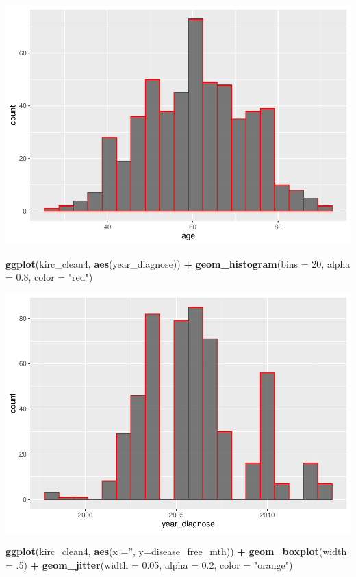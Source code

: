 \documentclass[]{article}
\newenvironment{Shaded}{\begin{snugshade}}{\end{snugshade}}
\newcommand{\KeywordTok}[1]{\textcolor[rgb]{0.13,0.29,0.53}{\textbf{#1}}}
\newcommand{\DataTypeTok}[1]{\textcolor[rgb]{0.13,0.29,0.53}{#1}}
\newcommand{\DecValTok}[1]{\textcolor[rgb]{0.00,0.00,0.81}{#1}}
\newcommand{\FloatTok}[1]{\textcolor[rgb]{0.00,0.00,0.81}{#1}}
\newcommand{\StringTok}[1]{\textcolor[rgb]{0.31,0.60,0.02}{#1}}
\newcommand{\OperatorTok}[1]{\textcolor[rgb]{0.81,0.36,0.00}{\textbf{#1}}}
\newcommand{\NormalTok}[1]{#1}
\begin{document}
\includegraphics{figs/render-unnamed-chunk-15-1.pdf}

\begin{Shaded}
\begin{Highlighting}[]
\KeywordTok{ggplot}\NormalTok{(kirc_clean4, }\KeywordTok{aes}\NormalTok{(year_diagnose)) }\OperatorTok{+}
\StringTok{     }\KeywordTok{geom_histogram}\NormalTok{(}\DataTypeTok{bins =} \DecValTok{20}\NormalTok{, }\DataTypeTok{alpha =} \FloatTok{0.8}\NormalTok{, }\DataTypeTok{color =} \StringTok{"red"}\NormalTok{)}
\end{Highlighting}
\end{Shaded}

\includegraphics{figs/render-unnamed-chunk-16-1.pdf}

\begin{Shaded}
\begin{Highlighting}[]
\KeywordTok{ggplot}\NormalTok{(kirc_clean4, }\KeywordTok{aes}\NormalTok{(}\DataTypeTok{x =}\StringTok{''}\NormalTok{, }\DataTypeTok{y=}\NormalTok{disease_free_mth)) }\OperatorTok{+}
\StringTok{     }\KeywordTok{geom_boxplot}\NormalTok{(}\DataTypeTok{width =}\NormalTok{ .}\DecValTok{5}\NormalTok{) }\OperatorTok{+}
\StringTok{     }\KeywordTok{geom_jitter}\NormalTok{(}\DataTypeTok{width =} \FloatTok{0.05}\NormalTok{, }\DataTypeTok{alpha =} \FloatTok{0.2}\NormalTok{, }\DataTypeTok{color =} \StringTok{"orange"}\NormalTok{)}
\end{Highlighting}
\end{Shaded}
\end{document}
